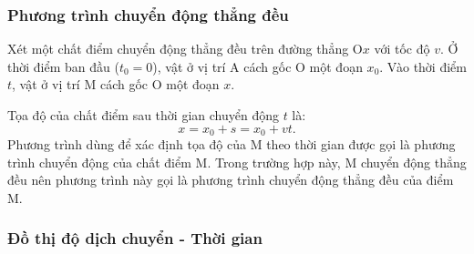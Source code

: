 \begin{tomtat}
	\subsubsection{Phương trình chuyển động thẳng đều}
	Xét một chất điểm chuyển động thẳng đều trên đường thẳng O$x$ với tốc độ $v$. Ở thời điểm ban đầu ($t_0=0$), vật ở vị trí A cách gốc O một đoạn $x_0$. Vào thời điểm $t$, vật ở vị trí M cách gốc O một đoạn $x$.  
	\begin{center}
	\end{center}
	
	Tọa độ của chất điểm sau thời gian chuyển động $t$ là:
	\begin{equation}
		x=x_0+s=x_0+vt.
	\end{equation}
	Phương trình dùng để xác định tọa độ của M theo thời gian được gọi là phương trình chuyển động của chất điểm M. Trong trường hợp này, M chuyển động thẳng đều nên phương trình này gọi là phương trình chuyển động thẳng đều của điểm M. 
	\subsubsection{Đồ thị độ dịch chuyển - Thời gian}

\end{tomtat}
